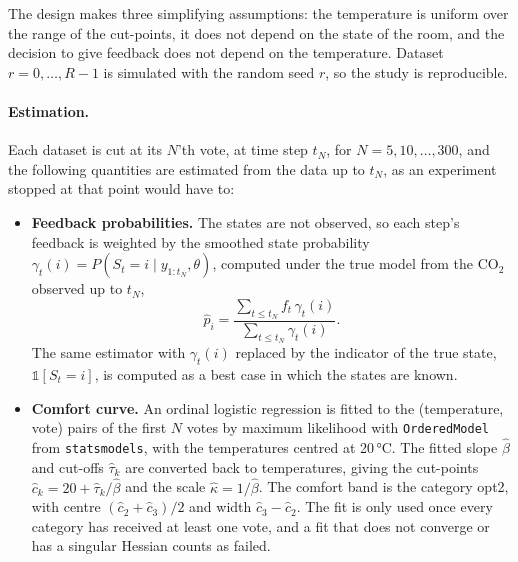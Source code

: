 The design makes three simplifying assumptions: the temperature is uniform over
the range of the cut-points, it does not depend on the state of the room, and
the decision to give feedback does not depend on the temperature.
Dataset $r = 0, \dots, R-1$ is simulated with the random seed $r$, so the study
is reproducible.

\paragraph{Estimation.}
Each dataset is cut at its $N$'th vote, at time step $t_N$, for
$N = 5, 10, \dots, 300$, and the following quantities are estimated from the
data up to $t_N$, as an experiment stopped at that point would have to:
\begin{itemize}
    \item \textbf{Feedback probabilities.} The states are not observed, so each
    step's feedback is weighted by the smoothed state probability
    $\gamma_t(i) = P(S_t = i \mid y_{1:t_N}, \theta)$, computed under the true
    model from the $\text{CO}_2$ observed up to $t_N$,
    \begin{equation}
        \hat{p}_i = \frac{\sum_{t \leq t_N} f_t\, \gamma_t(i)}{\sum_{t \leq t_N} \gamma_t(i)}.
    \end{equation}
    The same estimator with $\gamma_t(i)$ replaced by the indicator of the true
    state, $\mathds{1}[S_t = i]$, is computed as a best case in which the states
    are known.
    \item \textbf{Comfort curve.} An ordinal logistic regression is fitted to the
    (temperature, vote) pairs of the first $N$ votes by maximum likelihood with
    \texttt{OrderedModel} from \texttt{statsmodels}, with the temperatures
    centred at 20\,°C. The fitted slope $\hat{\beta}$ and cut-offs
    $\hat{\tau}_k$ are converted back to temperatures, giving the cut-points
    $\hat{c}_k = 20 + \hat{\tau}_k / \hat{\beta}$ and the scale
    $\hat{\kappa} = 1/\hat{\beta}$. The comfort band is the category opt2, with
    centre $(\hat{c}_2 + \hat{c}_3)/2$ and width $\hat{c}_3 - \hat{c}_2$. The fit
    is only used once every category has received at least one vote, and a fit
    that does not converge or has a singular Hessian counts as failed.
\end{itemize}

